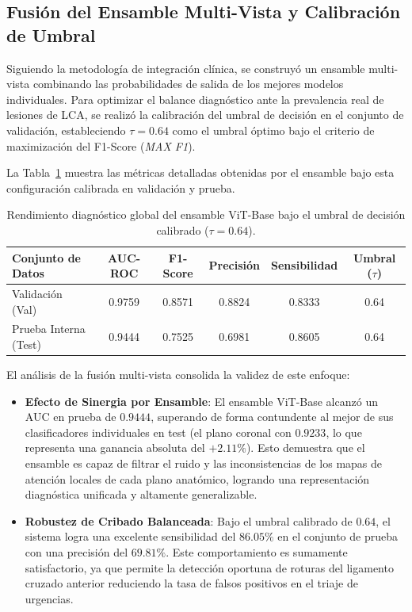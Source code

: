 \subsection{Fusión del Ensamble Multi-Vista y Calibración de Umbral}
Siguiendo la metodología de integración clínica, se construyó un ensamble multi-vista combinando las probabilidades de salida de los mejores modelos individuales. Para optimizar el balance diagnóstico ante la prevalencia real de lesiones de LCA, se realizó la calibración del umbral de decisión en el conjunto de validación, estableciendo $\tau = 0.64$ como el umbral óptimo bajo el criterio de maximización del F1-Score (\textit{MAX F1}). 

La Tabla~\ref{tab:ensemble_vitbase} muestra las métricas detalladas obtenidas por el ensamble bajo esta configuración calibrada en validación y prueba.

\begin{table}[htbp]
\centering
\caption{Rendimiento diagnóstico global del ensamble ViT-Base bajo el umbral de decisión calibrado ($\tau = 0.64$).}
\label{tab:ensemble_vitbase}
\begin{tabular}{lccccc}
\hline
\textbf{Conjunto de Datos} & \textbf{AUC-ROC} & \textbf{F1-Score} & \textbf{Precisión} & \textbf{Sensibilidad} & \textbf{Umbral ($\tau$)} \\ \hline
Validación (Val)           & 0.9759           & 0.8571            & 0.8824             & 0.8333                & 0.64                     \\
Prueba Interna (Test)      & 0.9444           & 0.7525            & 0.6981             & 0.8605                & 0.64                     \\ \hline
\end{tabular}
\end{table}

El análisis de la fusión multi-vista consolida la validez de este enfoque:
\begin{itemize}
    \item \textbf{Efecto de Sinergia por Ensamble}: El ensamble ViT-Base alcanzó un AUC en prueba de $0.9444$, superando de forma contundente al mejor de sus clasificadores individuales en test (el plano coronal con $0.9233$, lo que representa una ganancia absoluta del $+2.11\%$). Esto demuestra que el ensamble es capaz de filtrar el ruido y las inconsistencias de los mapas de atención locales de cada plano anatómico, logrando una representación diagnóstica unificada y altamente generalizable.
    \item \textbf{Robustez de Cribado Balanceada}: Bajo el umbral calibrado de $0.64$, el sistema logra una excelente sensibilidad del $86.05\%$ en el conjunto de prueba con una precisión del $69.81\%$. Este comportamiento es sumamente satisfactorio, ya que permite la detección oportuna de roturas del ligamento cruzado anterior reduciendo la tasa de falsos positivos en el triaje de urgencias.
\end{itemize}

